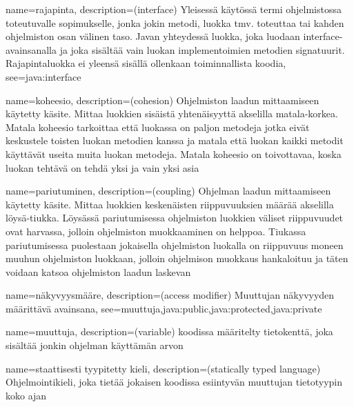 {
    name=rajapinta,
    description={(interface) Yleisessä käytössä termi ohjelmistossa toteutuvalle sopimukselle,
jonka jokin metodi, luokka tmv. toteuttaa tai kahden ohjelmiston osan välinen taso. Javan
yhteydessä luokka, joka luodaan interface-avainsanalla ja joka sisältää vain
luokan implementoimien metodien signatuurit. Rajapintaluokka ei yleensä sisällä ollenkaan
toiminnallista koodia},
    see={java:interface}
}

{
    name=koheesio,
    description={(cohesion) Ohjelmiston laadun mittaamiseen käytetty käsite.
Mittaa luokkien sisäistä yhtenäisyyttä akselilla matala-korkea. Matala koheesio
tarkoittaa että luokassa on paljon metodeja jotka eivät keskustele toisten
luokan metodien kanssa ja matala että luokan kaikki metodit käyttävät useita
muita luokan metodeja. Matala koheesio on toivottavaa, koska luokan tehtävä
on tehdä yksi ja vain yksi asia}
}

{
    name=pariutuminen,
    description={(coupling) Ohjelman laadun mittaamiseen käytetty käsite.
Mittaa luokkien keskenäisten riippuvuuksien määrää akselilla löysä-tiukka.
Löysässä pariutumisessa ohjelmiston luokkien väliset riippuvuudet ovat
harvassa, jolloin ohjelmiston muokkaaminen on helppoa. Tiukassa pariutumisessa
puolestaan jokaisella ohjelmiston luokalla on riippuvuus moneen muuhun
ohjelmiston luokkaan, jolloin ohjelmison muokkaus hankaloituu ja täten voidaan
katsoa ohjelmiston laadun laskevan}
}


{
    name=näkyvyysmääre,
    description={(access modifier) Muuttujan näkyvyyden määrittävä avainsana},
    see={muuttuja,java:public,java:protected,java:private}
}

{
    name=muuttuja,
    description={(variable) koodissa määritelty tietokenttä, joka sisältää jonkin ohjelman
käyttämän arvon}
}

{
    name=staattisesti tyypitetty kieli,
    description={(statically typed language) Ohjelmointikieli, joka tietää jokaisen koodissa
esiintyvän muuttujan tietotyypin koko ajan}
}

